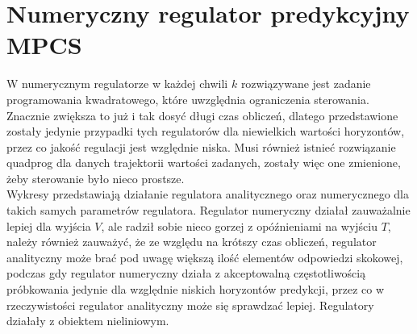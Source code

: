 \section{Numeryczny regulator predykcyjny MPCS}
\indent W numerycznym regulatorze w każdej chwili $k$ rozwiązywane jest zadanie programowania kwadratowego, które uwzględnia ograniczenia sterowania. Znacznie zwiększa to już i tak dosyć długi czas obliczeń, dlatego przedstawione zostały jedynie przypadki tych regulatorów dla niewielkich wartości horyzontów, przez co jakość regulacji jest względnie niska. Musi również istnieć rozwiązanie quadprog dla danych trajektorii wartości zadanych, zostały więc one zmienione, żeby sterowanie było nieco prostsze. \\ \indent Wykresy przedstawiają działanie regulatora analitycznego oraz numerycznego dla takich samych parametrów regulatora. Regulator numeryczny działał zauważalnie lepiej dla wyjścia $V$, ale radził sobie nieco gorzej z opóźnieniami na wyjściu $T$, należy również zauważyć, że ze względu na krótszy czas obliczeń, regulator analityczny może brać pod uwagę większą ilość elementów odpowiedzi skokowej, podczas gdy regulator numeryczny działa z akceptowalną częstotliwością próbkowania jedynie dla względnie niskich horyzontów predykcji, przez co w rzeczywistości regulator analityczny może się sprawdzać lepiej. Regulatory działały z obiektem nieliniowym.



\FloatBarrier
    
\FloatBarrier

\FloatBarrier
    
\FloatBarrier

\FloatBarrier
    
\FloatBarrier